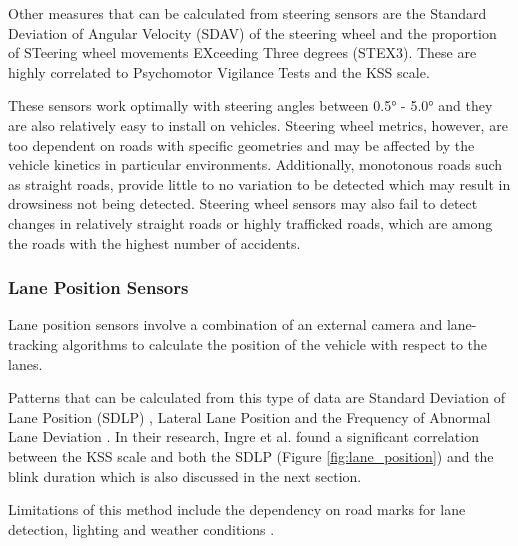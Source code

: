 \documentclass[12pt]{extarticle}
\begin{document}
Other measures that can be calculated from steering sensors are the
Standard Deviation of Angular Velocity (SDAV) of the steering wheel and
the proportion of STeering wheel movements EXceeding Three degrees
(STEX3). These are highly correlated to Psychomotor Vigilance Tests and
the KSS scale. \cite{forsman_efficient_2013}

These sensors work optimally with steering angles between 0.5° - 5.0°
and they are also relatively easy to install on vehicles. Steering wheel
metrics, however, are too dependent on roads with specific geometries
and may be affected by the vehicle kinetics in particular environments.
Additionally, monotonous roads such as straight roads, provide little to
no variation to be detected which may result in drowsiness not being
detected. Steering wheel sensors may also fail to detect changes in
relatively straight roads or highly trafficked roads, which are among
the roads with the highest number of accidents.
\cite{eskandarian_evaluation_2007}

\hypertarget{lane-position-sensors}{%
\subsubsection{Lane Position Sensors}\label{lane-position-sensors}}

Lane position sensors involve a combination of an external camera and
lane-tracking algorithms to calculate the position of the vehicle with
respect to the lanes.

Patterns that can be calculated from this type of data are Standard
Deviation of Lane Position (SDLP) \cite{ingre_subjective_2006}, Lateral
Lane Position \cite{cheng_driver_2012} and the Frequency of Abnormal
Lane Deviation \cite{hu_experimental_2017}. In their research, Ingre et
al. \cite{ingre_subjective_2006} found a significant correlation between
the KSS scale and both the SDLP (Figure \ref{fig:lane_position}) and the blink duration
which is also discussed in the next section.

Limitations of this method include the dependency on road marks for lane detection, lighting and weather
conditions \cite{sahayadhas_detecting_2012}.
\end{document}
